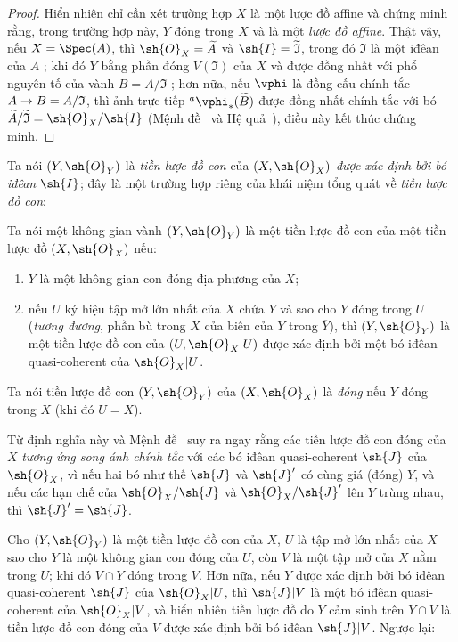 \documentclass[oneside]{amsart}
\makeatletter
\newcommand{\ega@arrow}[2]{\mathchoice{#1}{#2}{#2}{#2}}
\renewcommand{\to}{\ega@arrow{\longrightarrow}{\rightarrow}}
\newcommand{\oldpage}[2][]{{\marginnote{\normalfont\textbf{#1}~|~#2}}\ignorespaces}
\let\EGAOriginalLabel\label
\renewcommand{\label}[1]{\phantomsection\EGAOriginalLabel{#1}}
\makeatother
\begin{document}
\begin{proof}
\oldpage[I]{120}
Hiển nhiên chỉ cần  xét trường hợp $X$ là một lược đồ affine và chứng minh rằng, trong trường hợp này, $Y$ đóng trong $X$ và là một \emph{lược đồ affine}.
Thật vậy, nếu $X=\Spec(A)$, thì $\sh{O}_X=\widetilde{A}$ và $\sh{I}=\widetilde{\mathfrak{I}}$, trong đó $\mathfrak{I}$ là một iđêan của $A$ ;
khi đó $Y$ bằng phần đóng $V(\mathfrak{I})$ của $X$ và được đồng nhất với phổ nguyên tố của vành $B=A/\mathfrak{I}$ ;
hơn nữa, nếu $\vphi$ là đồng cấu chính tắc $A\to B=A/\mathfrak{I}$, thì ảnh trực tiếp ${}^a\vphi_*(\widetilde{B})$ được đồng nhất chính tắc với bó $\widetilde{A}/\widetilde{\mathfrak{I}}=\sh{O}_X/\sh{I}$ (Mệnh đề~ và Hệ quả~), điều này kết thúc chứng minh.
\end{proof}

Ta nói $(Y,\sh{O}_Y)$ là \emph{tiền lược đồ con} của $(X,\sh{O}_X)$ \emph{được xác định bởi bó iđêan $\sh{I}$};
đây là một trường hợp riêng của khái niệm tổng quát về \emph{tiền lược đồ con}:

\begin{definition}[4.1.3]
\label{I.4.1.3}
Ta nói một không gian vành $(Y,\sh{O}_Y)$ là một tiền lược đồ con của một tiền lược đồ $(X,\sh{O}_X)$ nếu:
\begin{enumerate}
  \item[1.º] $Y$ là một không gian con đóng địa phương của $X$;
  \item[2.º] nếu $U$ ký hiệu tập mở lớn nhất của $X$ chứa $Y$ và sao cho $Y$ đóng trong $U$ (\emph{tương đương}, phần bù trong $X$ của biên của $Y$ trong $\overline{Y}$), thì $(Y,\sh{O}_Y)$ là một tiền lược đồ con của $(U,\sh{O}_X|U)$ được xác định bởi một bó iđêan quasi-coherent của $\sh{O}_X|U$.
\end{enumerate}
Ta nói tiền lược đồ con $(Y,\sh{O}_Y)$ của $(X,\sh{O}_X)$ là \emph{đóng} nếu $Y$ đóng trong $X$ (khi đó $U=X$).
\end{definition}

Từ định nghĩa này và Mệnh đề~ suy ra ngay rằng các tiền lược đồ con đóng của $X$ \emph{tương ứng song ánh chính tắc} với các bó iđêan quasi-coherent $\sh{J}$ của $\sh{O}_X$, vì nếu hai bó như thế $\sh{J}$ và $\sh{J}'$ có cùng giá (đóng) $Y$, và nếu các hạn chế của $\sh{O}_X/\sh{J}$ và $\sh{O}_X/\sh{J}'$ lên $Y$ trùng nhau, thì $\sh{J}'=\sh{J}$.

\begin{env}[4.1.4]
\label{I.4.1.4}
Cho $(Y,\sh{O}_Y)$ là một tiền lược đồ con của $X$, $U$ là tập mở lớn nhất của $X$ sao cho $Y$ là một không gian con đóng của $U$, còn $V$ là một tập mở của $X$ nằm trong $U$;
khi đó $V\cap Y$ đóng trong $V$.
Hơn nữa, nếu $Y$ được xác định bởi bó iđêan quasi-coherent $\sh{J}$ của $\sh{O}_X|U$, thì $\sh{J}|V$ là một bó iđêan quasi-coherent của $\sh{O}_X|V$, và hiển nhiên tiền lược đồ do $Y$ cảm sinh trên $Y\cap V$ là tiền lược đồ con đóng của $V$ được xác định bởi bó iđêan $\sh{J}|V$.
Ngược lại:
\end{env}
\end{document}
